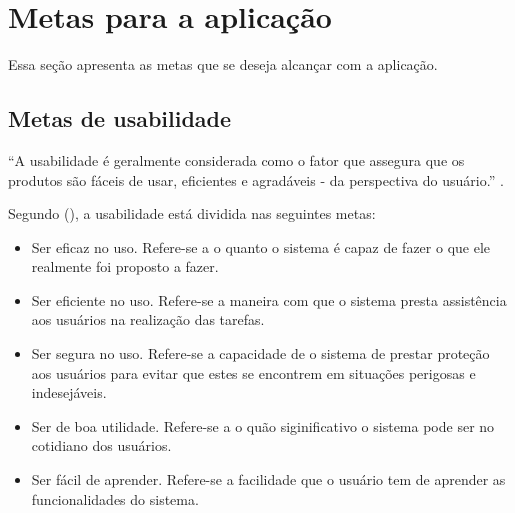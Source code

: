 \chapter{Metas para a aplicação}
  
  Essa seção apresenta as metas que se deseja alcançar com a aplicação.

  \section{Metas de usabilidade}
  
    “A usabilidade é geralmente considerada como o fator que assegura que os produtos são fáceis de usar, 
    eficientes e agradáveis - da perspectiva do usuário.” \cite{preece}.
    
    Segundo \citeauthor{preece} (\citeyear{preece}), a usabilidade está dividida nas seguintes metas:
    
    \begin{itemize}
       \item Ser eficaz no uso.
       \subitem Refere-se a o quanto o sistema é capaz de fazer o que ele realmente foi proposto a fazer.
    \end{itemize}
    
    \begin{itemize}
       \item Ser eficiente no uso.
       \subitem Refere-se a maneira com que o sistema presta assistência aos usuários na realização das tarefas.
    \end{itemize}
    
    \begin{itemize}
       \item Ser segura no uso.
       \subitem Refere-se a capacidade de o sistema de prestar proteção aos usuários para evitar que estes se encontrem 
       em situações perigosas e indesejáveis.
    \end{itemize}
    
    \begin{itemize}
       \item Ser de boa utilidade.
       \subitem Refere-se a o quão siginificativo o sistema pode ser no cotidiano dos usuários.
    \end{itemize}
    
    \begin{itemize}
       \item Ser fácil de aprender.
       \subitem Refere-se a facilidade que o usuário tem de aprender as funcionalidades do sistema.
    \end{itemize}
    
